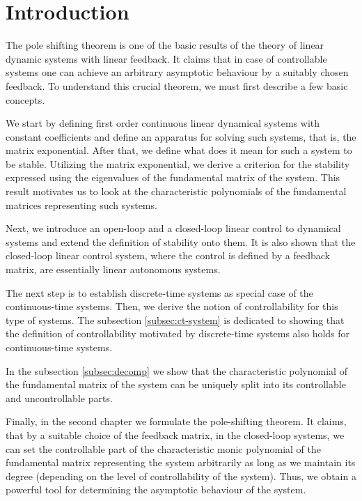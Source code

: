 \chapter*{Introduction}

The pole shifting theorem is one of the basic results of the theory of linear dynamic systems with linear feedback. It claims that in case of controllable systems one can achieve an arbitrary asymptotic behaviour by a suitably chosen feedback. To understand this crucial theorem, we must first describe a few basic concepts. 

We start by defining first order continuous linear dynamical systems with constant coefficients and define an apparatus for solving such systems, that is, the matrix exponential. After that, we define what does it mean for such a system to be stable. Utilizing the matrix exponential, we derive a criterion for the stability expressed using the eigenvalues of the fundamental matrix of the system. This result motivates us to look at the characteristic polynomials of the fundamental matrices representing such systems. 

Next, we introduce an open-loop and a closed-loop linear control to dynamical systems and extend the definition of stability onto them. It is also shown that the closed-loop linear control system, where the control is defined by a feedback matrix, are essentially linear autonomous systems. 

The next step is to establish discrete-time systems as special case of the continuous-time systems. Then, we derive the notion of controllability for this type of systems. The subsection \ref{subsec:ct-system} is dedicated to showing that the definition of controllability motivated by discrete-time systems also holds for continuous-time systems.

In the subsection \ref{subsec:decomp} we show that the characteristic polynomial of the fundamental matrix of the system can be uniquely split into its controllable and uncontrollable parts. 

Finally, in the second chapter we formulate the pole-shifting theorem. It claims, that by a suitable choice of the feedback matrix, in the closed-loop systems, we can set the controllable part of the characteristic monic polynomial of the fundamental matrix representing the system arbitrarily as long as we maintain its degree (depending on the level of controllability of the system). Thus, we obtain a powerful tool for determining the asymptotic behaviour of the system.